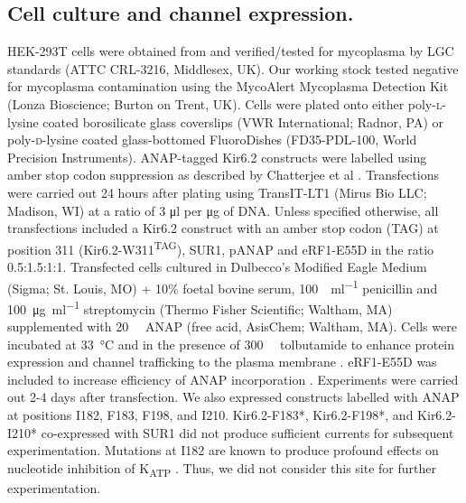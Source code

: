 \documentclass[9pt,lineno, onehalfspacing]{elife_modified}
\begin{document}
\subsection{Cell culture and channel expression.}
HEK-293T cells were obtained from and verified/tested for mycoplasma by LGC standards (ATTC CRL-3216, Middlesex, UK).
Our working stock tested negative for mycoplasma contamination using the MycoAlert Mycoplasma Detection Kit (Lonza Bioscience; Burton on Trent, UK).
Cells were plated onto either poly-\textsc{l}-lysine coated borosilicate glass coverslips (VWR International; Radnor, PA) or poly-\textsc{d}-lysine coated glass-bottomed FluoroDishes (FD35-PDL-100, World Precision Instruments).
ANAP-tagged Kir6.2 constructs were labelled using amber stop codon suppression as described by Chatterjee et al \citep{RN17}.
Transfections were carried out 24 hours after plating using TransIT-LT1 (Mirus Bio LLC; Madison, WI) at a ratio of 3 \si{\micro\litre} per \si{\micro\gram} of DNA.
Unless specified otherwise, all transfections included a Kir6.2 construct with an amber stop codon (TAG) at position 311 (Kir6.2-W311\textsuperscript{TAG}), SUR1, pANAP and eRF1-E55D in the ratio 0.5:1.5:1:1.
Transfected cells cultured in Dulbecco’s Modified Eagle Medium (Sigma; St. Louis, MO) + 10\% foetal bovine serum, \SI{100}{\Unit\per\milli\litre} penicillin and \SI{100}{\micro\gram\per\milli\litre} streptomycin (Thermo Fisher Scientific; Waltham, MA) supplemented with \SI{20}{\milli\Molar} ANAP (free acid, AsisChem; Waltham, MA).
Cells were incubated at \SI{33}{\degreeCelsius} and in the presence of \SI{300}{\micro\Molar} tolbutamide to enhance protein expression and channel trafficking to the plasma membrane \citep{RN106, RN49}.
eRF1-E55D was included to increase efficiency of ANAP incorporation \citep{RN42}.
Experiments were carried out 2-4 days after transfection.
We also expressed constructs labelled with ANAP at positions I182, F183, F198, and I210.
Kir6.2-F183*, Kir6.2-F198*, and Kir6.2-I210* co-expressed with SUR1 did not produce sufficient currents for subsequent experimentation.
Mutations at I182 are known to produce profound effects on nucleotide inhibition of K\textsubscript{ATP} \citep{RN107}.
Thus, we did not consider this site for further experimentation.
\end{document}
